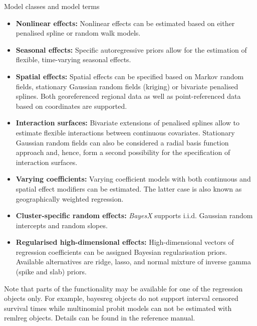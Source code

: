 \begin{stanza}{Model classes and model terms}
\begin{itemize}
\item{\bf\sffamily Nonlinear effects:} Nonlinear effects can be estimated based on either penalised spline or random walk
    models.

\item{\bf\sffamily Seasonal effects:} Specific autoregressive priors allow for the estimation of flexible, time-varying
    seasonal effects.

\item{\bf\sffamily Spatial effects:} Spatial effects can be specified based on Markov random fields, stationary Gaussian
    random fields (kriging) or bivariate penalised splines. Both georeferenced regional data as well as point-referenced
    data based on coordinates are supported.

\item{\bf\sffamily Interaction surfaces:} Bivariate extensions of penalised splines allow to estimate flexible interactions
    between continuous covariates. Stationary Gaussian random fields can also be considered a radial basis function
    approach and, hence, form a second possibility for the specification of interaction surfaces.

\item{\bf\sffamily Varying coefficients:} Varying coefficient models with both continuous and spatial effect modifiers can
    be estimated. The latter case is also known as geographically weighted regression.

\item{\bf\sffamily Cluster-specific random effects:} {\em BayesX} supports i.i.d. Gaussian random intercepts and random
    slopes.

\item {\bf\sffamily Regularised high-dimensional effects:} High-dimensional vectors of regression coefficients can be
    assigned Bayesian regularisation priors. Available alternatives are ridge, lasso, and normal mixture of inverse gamma
    (spike and slab) priors.
\end{itemize}

Note that parts of the functionality may be available for one of the regression objects only. For example, bayesreg objects do
not support interval censored survival times while multinomial probit models can not be estimated with remlreg objects. Details
can be found in the reference manual.
\end{stanza}

